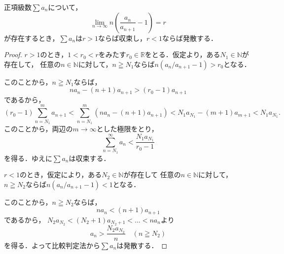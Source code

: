 \documentclass[a4paper,10pt,fleqn]{ltjsarticle}
\begin{document}

正項級数$\sum a_n$について，
\[
    \lim_{n\to\infty} n \left(\frac{a_n}{a_{n+1}}-1 \right) = r
\]
が存在するとき，$\sum a_n$は$r >1$ならば収束し，$r < 1$ならば発散する．

\begin{proof}
    $r>1$のとき，$ 1< r_0 < r$をみたす$r_0 \in \mathbb{R}$をとる．仮定より，ある$N_1 \in \mathbb{N}$が存在して，
    任意の$n \in \mathbb{N}$に対して，$n \geqq N_1$ならば$n (a_n/a_{n+1}-1) > r_0$となる．

    このことから，$ n \geqq N_1$ならば，
    \[
        n a_n -(n+1)a_{n+1} > (r_0-1) a_{n+1}
    \]
    であるから，
    \[
        (r_0-1) \sum_{n=N_1}^{m} a_{n+1}  < \sum_{n=N_1}^{m} (n a_n - (n+1) a_{n+1})
        <N_1 a_{N_1} - (m+1) a_{m+1}
        < N_1 a_{N_1}.
    \]
    このことから，両辺の$m \to \infty$とした極限をとり，
    \[
        \sum_{n=N_1}^{\infty} a_n <\frac{N_1 a_{N_1}}{r_0-1}
    \]
    を得る．ゆえに$\sum a_n$は収束する．

    $r < 1$のとき，仮定により，ある$N_2 \in \mathbb{N}$が存在して
    任意の$n \in \mathbb{N}$に対して，$n \geqq N_2$ならば$n(a_n/a_{n+1}-1) < 1$となる．

    このことから，$n \geqq N_2$ならば，
    \[
        n a_n < (n+1) a_{n+1}
    \]
    であるから， $N_2 a_{N_2} < (N_2 +1)a_{N_2+1} <  \dots< n a_n $より
    \[
        a_n > \frac{N_2 a_{N_2}}{n} \quad (n \geqq N_2)
    \]
    を得る．よって比較判定法から$\sum a_n$は発散する．
\end{proof}
\end{document}
